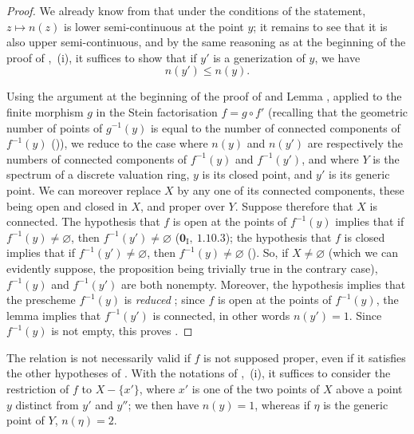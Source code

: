 \begin{proof}
We already know from  that under the conditions of the statement, $z\mapsto n(z)$ is lower semi-continuous at the point $y$; it remains to see that it is also upper semi-continuous, and by the same reasoning as at the beginning of the proof of ,~(i), it suffices to show that if $y'$ is a generization of $y$, we have
\begin{equation}
\tag{15.5.7.1}
\label{IV.15.5.7.1}
  n(y') \leq n(y).
\end{equation}

Using the argument at the beginning of the proof of  and Lemma , applied to the finite morphism $g$ in the Stein factorisation $f=g\circ f'$ (recalling that the geometric number of points of $g^{-1}(y)$ is equal to the number of connected components of $f^{-1}(y)$ ()), we reduce to the case where $n(y)$ and $n(y')$ are respectively the numbers of connected components of $f^{-1}(y)$ and $f^{-1}(y')$, and where $Y$ is the spectrum of a discrete valuation ring, $y$ is its closed point, and $y'$ is its generic point.
We can moreover replace $X$ by any one of its connected components, these being open and closed in $X$, and proper over $Y$.
Suppose therefore that $X$ is connected. The hypothesis that $f$ is open at the points of $f^{-1}(y)$ implies that if $f^{-1}(y)\neq\varnothing$, then $f^{-1}(y')\neq\varnothing$ ($\mathbf{0}_{\mathrm{I}},~1.10.3$); the hypothesis that $f$ is closed implies that if $f^{-1}(y')\neq\varnothing$, then $f^{-1}(y)\neq\varnothing$ ().
So, if $X\neq\varnothing$ (which we can evidently suppose, the proposition being trivially true in the contrary case), $f^{-1}(y)$ and $f^{-1}(y')$ are both nonempty.
Moreover, the hypothesis implies that the prescheme $f^{-1}(y)$ is \emph{reduced} ; since $f$ is open at the points of $f^{-1}(y)$, the lemma  implies that $f^{-1}(y')$ is connected, in other words $n(y')=1$.
Since $f^{-1}(y)$ is not empty, this proves .
\end{proof}

\begin{remarks}[15.5.8]
\label{IV.15.5.8}
The relation  is not necessarily valid if $f$ is not supposed proper, even if it satisfies the other hypotheses of .
With the notations of ,~(i), it suffices to consider the restriction of $f$ to $X-\{x'\}$, where $x'$ is one of the two points of $X$ above a point $y$ distinct from $y'$ and $y''$; we then have $n(y)=1$, whereas if $\eta$ is the generic point of $Y$, $n(\eta)=2$.
\end{remarks}

